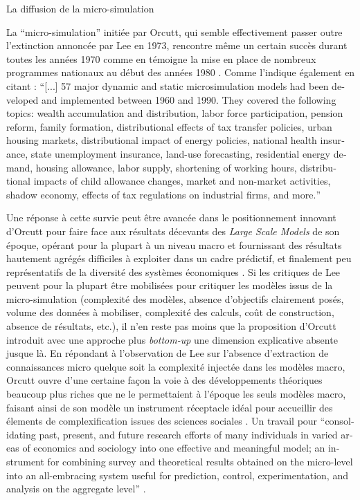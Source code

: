 \begin{testiv}{La diffusion de la micro-simulation}{}

La \enquote{micro-simulation} initiée par Orcutt, qui semble effectivement passer outre l'extinction annoncée par Lee en 1973, rencontre même un certain succès durant toutes les années 1970 comme en témoigne la mise en place de nombreux programmes nationaux au début des années 1980 \autocites{Merz1991, Merz1994, Baroni2007}. Comme l'indique également \textcite{Boman2005} en citant \textcite{Merz1991} : \foreignquote{english}{[...] 57 major dynamic and static microsimulation models had been developed and implemented between 1960 and 1990. They covered the following topics: wealth accumulation and distribution, labor force participation, pension reform, family formation, distributional effects of tax transfer policies, urban housing markets, distributional impact of energy policies, national health insurance, state unemployment insurance, land-use forecasting, residential energy demand, housing allowance, labor supply, shortening of working hours, distributional impacts of child allowance changes, market and non-market activities, shadow economy, effects of tax regulations on industrial firms, and more.}

Une réponse à cette survie peut être avancée dans le positionnement innovant d'Orcutt pour faire face aux résultats décevants des \textit{Large Scale Models} de son époque, opérant pour la plupart à un niveau macro et fournissant des résultats hautement agrégés difficiles à exploiter dans un cadre prédictif, et finalement peu représentatifs de la diversité des systèmes économiques \autocites{Birkin2012, Baroni2007}. Si les critiques de Lee peuvent pour la plupart être mobilisées pour critiquer les modèles issus de la micro-simulation (complexité des modèles, absence d'objectifs clairement posés, volume des données à mobiliser, complexité des calculs, coût de construction, absence de résultats, etc.), il n'en reste pas moins que la proposition d'Orcutt introduit avec une approche plus \textit{bottom-up} une dimension explicative absente jusque là. En répondant à l'observation de Lee sur l'absence d'extraction de connaissances micro quelque soit la complexité injectée dans les modèles macro, Orcutt ouvre d'une certaine façon la voie à des développements théoriques beaucoup plus riches que ne le permettaient à l'époque les seuls modèles macro, faisant ainsi de son modèle un instrument réceptacle idéal pour accueillir des élements de complexification issues des sciences sociales \autocite[19]{Czajka1993}. Un travail pour \foreignquote{english}{consolidating past, present, and future research efforts of many individuals in varied areas of economics and sociology into one effective and meaningful model; an instrument for combining survey and theoretical results obtained on the micro-level into an all-embracing system useful for prediction, control, experimentation, and analysis on the aggregate level} \autocite[122]{Cohen1961}.


\end{testiv}
